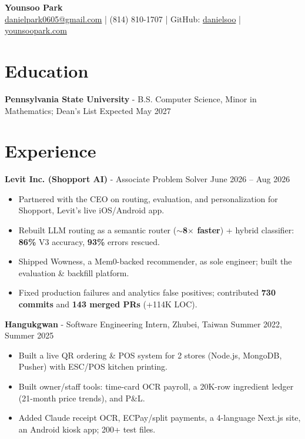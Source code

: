 \documentclass[11pt,a4paper]{article}
\newcommand{\blockspace}{\vspace{0.12em}}
\newenvironment{details}{\begin{itemize}[leftmargin=1.4em, label=\textbullet, topsep=0pt, itemsep=0pt, parsep=0pt, partopsep=0pt]}{\end{itemize}}
\begin{document}
\begin{center}
    {\LARGE \textbf{Younsoo Park}} \\
    \href{mailto:danielpark0605@gmail.com}{danielpark0605@gmail.com}
    \quad | \quad
    (814) 810-1707
    \quad | \quad
    GitHub:
    \href{https://github.com/danielsoo}{danielsoo}
    \quad | \quad
    \href{https://younsoopark.com}{younsoopark.com}
\end{center}

\section{Education}
\textbf{Pennsylvania State University} - B.S. Computer Science, Minor in Mathematics; Dean's List \hfill Expected May 2027

\section{Experience}
\noindent\textbf{Levit Inc. (Shopport AI)} - Associate Problem Solver \hfill June 2026 -- Aug 2026
\begin{details}
\item Partnered with the CEO on routing, evaluation, and personalization for Shopport, Levit's live iOS/Android app.
\item Rebuilt LLM routing as a semantic router (\textbf{$\sim$8$\times$ faster}) + hybrid classifier: \textbf{86\%} V3 accuracy, \textbf{93\%} errors rescued.
\item Shipped Wowness, a Mem0-backed recommender, as sole engineer; built the evaluation \& backfill platform.
\item Fixed production failures and analytics false positives; contributed \textbf{730 commits} and \textbf{143 merged PRs} (+114K LOC).
\end{details}
\blockspace

\noindent\textbf{Hangukgwan} - Software Engineering Intern, Zhubei, Taiwan \hfill Summer 2022, Summer 2025
\begin{details}
\item Built a live QR ordering \& POS system for 2 stores (Node.js, MongoDB, Pusher) with ESC/POS kitchen printing.
\item Built owner/staff tools: time-card OCR payroll, a 20K-row ingredient ledger (21-month price trends), and P\&L.
\item Added Claude receipt OCR, ECPay/split payments, a 4-language Next.js site, an Android kiosk app; 200+ test files.
\end{details}
\blockspace
\end{document}
